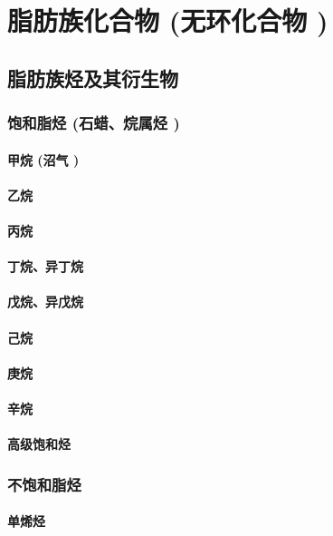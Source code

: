 \documentclass[UTF8]{../03-Chemistry}
\begin{document}
\chapter{脂肪族化合物 (无环化合物 )}
\section{脂肪族烃及其衍生物}
    \subsection{饱和脂烃 (石蜡、烷属烃 )}
        \subsubsection{甲烷 (沼气 )}
        \subsubsection{乙烷}
        \subsubsection{丙烷}
        \subsubsection{丁烷、异丁烷}
        \subsubsection{戊烷、异戊烷}
        \subsubsection{己烷}
        \subsubsection{庚烷}
        \subsubsection{辛烷}
        \subsubsection{高级饱和烃}
    \subsection{不饱和脂烃}
        \subsubsection{单烯烃}
\end{document}

